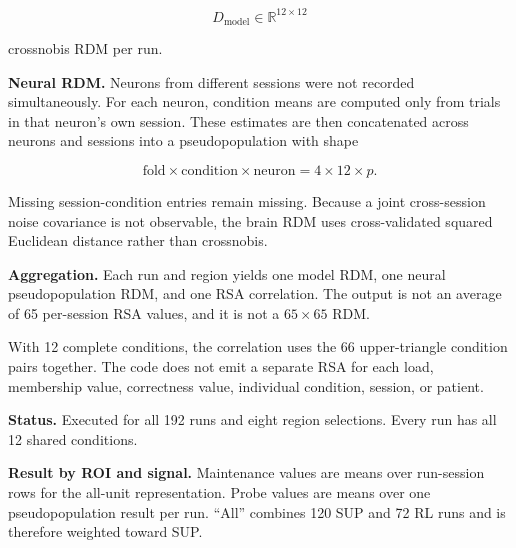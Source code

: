 \documentclass[
  10pt,
]{article}
\begin{document}
\[
D_{\mathrm{model}}\in\mathbb R^{12\times12}
\]

crossnobis RDM per run.

\textbf{Neural RDM.} Neurons from different sessions were not recorded
simultaneously. For each neuron, condition means are computed only from
trials in that neuron's own session. These estimates are then
concatenated across neurons and sessions into a pseudopopulation with
shape

\[
\text{fold}\times\text{condition}\times\text{neuron}
=
4\times12\times p.
\]

Missing session-condition entries remain missing. Because a joint
cross-session noise covariance is not observable, the brain RDM uses
cross-validated squared Euclidean distance rather than crossnobis.

\textbf{Aggregation.} Each run and region yields one model RDM, one
neural pseudopopulation RDM, and one RSA correlation. The output is not
an average of 65 per-session RSA values, and it is not a \(65\times65\)
RDM.

With 12 complete conditions, the correlation uses the 66 upper-triangle
condition pairs together. The code does not emit a separate RSA for each
load, membership value, correctness value, individual condition,
session, or patient.

\textbf{Status.} Executed for all 192 runs and eight region selections.
Every run has all 12 shared conditions.

\textbf{Result by ROI and signal.} Maintenance values are means over
run-session rows for the all-unit representation. Probe values are means
over one pseudopopulation result per run. ``All'' combines 120 SUP and
72 RL runs and is therefore weighted toward SUP.
\end{document}
